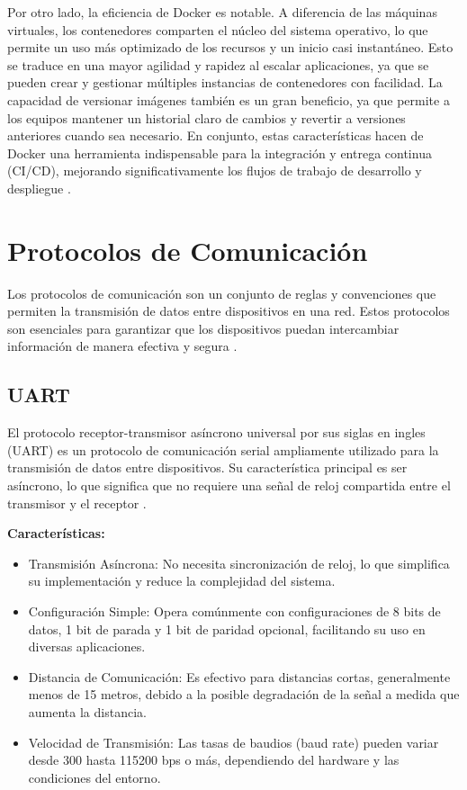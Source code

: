 Por otro lado, la eficiencia de Docker es notable. A diferencia de las máquinas virtuales, los contenedores comparten el núcleo del sistema operativo, lo que permite un uso más optimizado de los recursos y un inicio casi instantáneo. Esto se traduce en una mayor agilidad y rapidez al escalar aplicaciones, ya que se pueden crear y gestionar múltiples instancias de contenedores con facilidad. La capacidad de versionar imágenes también es un gran beneficio, ya que permite a los equipos mantener un historial claro de cambios y revertir a versiones anteriores cuando sea necesario. En conjunto, estas características hacen de Docker una herramienta indispensable para la integración y entrega continua (CI/CD), mejorando significativamente los flujos de trabajo de desarrollo y despliegue \cite{combe2016docker}.

\section{Protocolos de Comunicación}\label{sec:protocolos_de_comunicacion}

Los protocolos de comunicación son un conjunto de reglas y convenciones que permiten la transmisión de datos entre dispositivos en una red. Estos protocolos son esenciales para garantizar que los dispositivos puedan intercambiar información de manera efectiva y segura \cite{Eterovic2018AnlisisDP}.

\subsection{UART}

El protocolo receptor-transmisor asíncrono universal por sus siglas en ingles (UART) es un protocolo de comunicación serial ampliamente utilizado para la transmisión de datos entre dispositivos. Su característica principal es ser asíncrono, lo que significa que no requiere una señal de reloj compartida entre el transmisor y el receptor \cite{guananga2022comparacion} \cite{rojasmanejo}.

\textbf{Características:}

\begin{itemize}
    \item Transmisión Asíncrona: No necesita sincronización de reloj, lo que simplifica su implementación y reduce la complejidad del sistema.
    \item Configuración Simple: Opera comúnmente con configuraciones de 8 bits de datos, 1 bit de parada y 1 bit de paridad opcional, facilitando su uso en diversas aplicaciones.
    \item Distancia de Comunicación: Es efectivo para distancias cortas, generalmente menos de 15 metros, debido a la posible degradación de la señal a medida que aumenta la distancia.
    \item Velocidad de Transmisión: Las tasas de baudios (baud rate) pueden variar desde 300 hasta 115200 bps o más, dependiendo del hardware y las condiciones del entorno.
\end{itemize}


